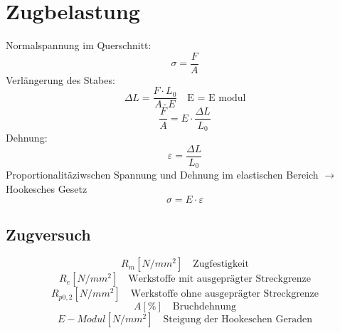 



\section{Zugbelastung}
Normalspannung im Querschnitt: 
\[ \sigma = \frac{F}{A} \]
Verlängerung des Stabes: 
\[ \Delta L = \frac{F \cdot L_0}{A \cdot E} \quad \text{E = E modul} \]
\[ \frac{F}{A} = E \cdot \frac{\Delta L}{L_0} \]
Dehnung: 
\[ \varepsilon = \frac{\Delta L}{L_0} \]
Proportionalitäziwschen Spannung und Dehnung im elastischen Bereich $\rightarrow$ Hookesches Gesetz
\[ \sigma = E \cdot \varepsilon \]
\subsection{Zugversuch}
\[ R_m [N/mm^2] \quad \text{Zugfestigkeit} \]
\[ R_e [N/mm^2] \quad \text{Werkstoffe mit ausgeprägter Streckgrenze} \]
\[ R_{p0,2} [N/mm^2] \quad \text{Werkstoffe ohne ausgeprägter Streckgrenze} \]
\[ A [\%] \quad \text{Bruchdehnung} \]
\[ E-Modul [N/mm^2] \quad \text{Steigung der Hookeschen Geraden} \]
